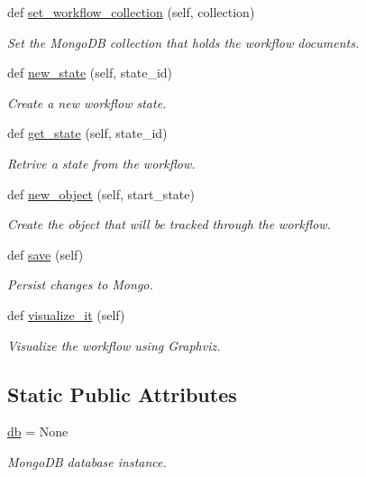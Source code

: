 \begin{DoxyCompactItemize}
def \hyperlink{classmain_1_1_cocopan_a636f9c9ee0425bdc1c4809d52c92fce5}{set\+\_\+workflow\+\_\+collection} (self, collection)
\begin{DoxyCompactList}\small\item\em Set the Mongo\+DB collection that holds the workflow documents. \end{DoxyCompactList}\item 
def \hyperlink{classmain_1_1_cocopan_a1307769651d0df594e76b5007c53c10c}{new\+\_\+state} (self, state\+\_\+id)
\begin{DoxyCompactList}\small\item\em Create a new workflow state. \end{DoxyCompactList}\item 
def \hyperlink{classmain_1_1_cocopan_a80ff2078aa4d0329f23afd68f095ecf0}{get\+\_\+state} (self, state\+\_\+id)
\begin{DoxyCompactList}\small\item\em Retrive a state from the workflow. \end{DoxyCompactList}\item 
def \hyperlink{classmain_1_1_cocopan_abcf9b046d219915b9e12109cb4030bf1}{new\+\_\+object} (self, start\+\_\+state)
\begin{DoxyCompactList}\small\item\em Create the object that will be tracked through the workflow. \end{DoxyCompactList}\item 
def \hyperlink{classmain_1_1_cocopan_aaada41d82a8822c4ced8b0bbb2fd8908}{save} (self)
\begin{DoxyCompactList}\small\item\em Persist changes to Mongo. \end{DoxyCompactList}\item 
def \hyperlink{classmain_1_1_cocopan_a9f32332006de37c15ecefb69635db519}{visualize\+\_\+it} (self)
\begin{DoxyCompactList}\small\item\em Visualize the workflow using Graphviz. \end{DoxyCompactList}\end{DoxyCompactItemize}
\subsection*{Static Public Attributes}
\begin{DoxyCompactItemize}
\item 
\hyperlink{classmain_1_1_cocopan_ae3c98cef0ee592633894874ad6d1a7ac}{db} = None\hypertarget{classmain_1_1_cocopan_ae3c98cef0ee592633894874ad6d1a7ac}{}\label{classmain_1_1_cocopan_ae3c98cef0ee592633894874ad6d1a7ac}

\begin{DoxyCompactList}\small\item\em Mongo\+DB database instance. \end{DoxyCompactList}\end{DoxyCompactItemize}


